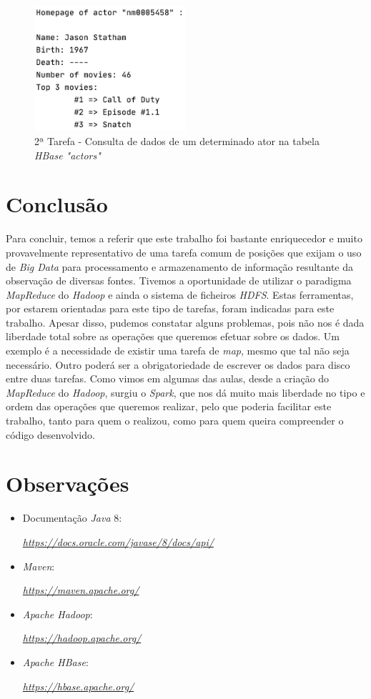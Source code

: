 \documentclass[a4paper]{report}
\begin{document}
{		\begin{figure}[H]
            \centering
            \includegraphics[width=0.50\textwidth]{Images/Task 2 - Homepage.png}
            \caption{2ª Tarefa - Consulta de dados de um determinado ator na tabela \textit{HBase "actors"}}
            \label{fig:21}
        \end{figure}
}

\chapter{Conclusão} \label{ch:Conclusion}
\large{
	Para concluir, temos a referir que este trabalho foi bastante enriquecedor e muito provavelmente representativo de uma tarefa comum de posições que exijam o uso de \textit{Big Data} para processamento e armazenamento de informação resultante da observação de diversas fontes.
	Tivemos a oportunidade de utilizar o paradigma \textit{MapReduce} do \textit{Hadoop} e ainda o sistema de ficheiros \textit{HDFS}. Estas ferramentas, por estarem orientadas para este tipo de tarefas, foram indicadas para este trabalho. Apesar disso, pudemos constatar alguns problemas, pois não nos é dada liberdade total sobre as operações que queremos efetuar sobre os dados. Um exemplo é a necessidade de existir uma tarefa de \textit{map}, mesmo que tal não seja necessário. Outro poderá ser a obrigatoriedade de escrever os dados para disco entre duas tarefas.
	Como vimos em algumas das aulas, desde a criação do \textit{MapReduce} do \textit{Hadoop}, surgiu o \textit{Spark}, que nos dá muito mais liberdade no tipo e ordem das operações que queremos realizar, pelo que poderia facilitar este trabalho, tanto para quem o realizou, como para quem queira compreender o código desenvolvido.
}

\appendix
\chapter{Observações} \label{ch:Observations}
\begin{itemize}
    \item Documentação \textit{Java} 8:
    \par \textit{\url{https://docs.oracle.com/javase/8/docs/api/}}
	\item \textit{Maven}:
    \par \textit{\url{https://maven.apache.org/}}
    \item \textit{Apache Hadoop}:
    \par \textit{\url{https://hadoop.apache.org/}}
    \item \textit{Apache HBase}:
    \par \textit{\url{https://hbase.apache.org/}}
\end{itemize}
\end{document}
